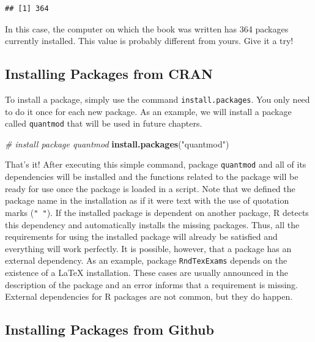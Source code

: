 \documentclass[11pt,]{book}
\newenvironment{Shaded}{\begin{snugshade}}{\end{snugshade}}
\newcommand{\KeywordTok}[1]{\textcolor[rgb]{0.27,0.27,0.27}{\textbf{#1}}}
\newcommand{\StringTok}[1]{\textcolor[rgb]{0.5,0.5,0.5}{#1}}
\newcommand{\CommentTok}[1]{\textcolor[rgb]{0.56,0.35,0.01}{\textit{#1}}}
\newcommand{\NormalTok}[1]{#1}
\begin{document}
\begin{verbatim}
## [1] 364
\end{verbatim}

In this case, the computer on which the book was written has 364
packages currently installed. This value is probably different from
yours. Give it a try!

\subsection{Installing Packages from
CRAN}\label{installing-packages-from-cran}

To install a package, simply use the command \texttt{install.packages}.
You only need to do it once for each new package. As an example, we will
install a package called \texttt{quantmod} that will be used in future
chapters. 

\begin{Shaded}
\begin{Highlighting}[]
\CommentTok{# install package quantmod}
\KeywordTok{install.packages}\NormalTok{(}\StringTok{"quantmod"}\NormalTok{)}
\end{Highlighting}
\end{Shaded}

That's it! After executing this simple command, package
\texttt{quantmod} and all of its dependencies will be installed and the
functions related to the package will be ready for use once the package
is loaded in a script. Note that we defined the package name in the
installation as if it were text with the use of quotation marks
(\texttt{"\ "}). If the installed package is dependent on another
package, R detects this dependency and automatically installs the
missing packages. Thus, all the requirements for using the installed
package will already be satisfied and everything will work perfectly. It
is possible, however, that a package has an external dependency. As an
example, package \texttt{RndTexExams} depends on the existence of a
LaTeX installation. These cases are usually announced in the description
of the package and an error informs that a requirement is missing.
External dependencies for R packages are not common, but they do happen.

\subsection{Installing Packages from
Github}\label{installing-packages-from-github}
\end{document}
